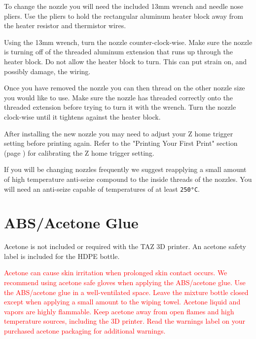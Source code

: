 To change the nozzle you will need the included 13mm wrench and needle nose pliers. Use the pliers to hold the rectangular aluminum heater block away from the heater resistor and thermistor wires.

Using the 13mm wrench, turn the nozzle counter-clock-wise. Make sure the nozzle is turning off of the threaded aluminum extension that runs up through the heater block. Do not allow the heater block to turn. This can put strain on, and possibly damage, the wiring.

Once you have removed the nozzle you can then thread on the other nozzle size you would like to use. Make sure the nozzle has threaded correctly onto the threaded extension before trying to turn it with the wrench. Turn the nozzle clock-wise until it tightens against the heater block.

After installing the new nozzle you may need to adjust your Z home trigger setting before printing again. Refer to the "Printing Your First Print" section (page \pageref{firstprint}) for calibrating the Z home trigger setting.

If you will be changing nozzles frequently we suggest reapplying a small amount of high temperature anti-seize compound to the inside threads of the nozzles. You will need an anti-seize capable of temperatures of at least \texttt{250°C}.

\section{ABS/Acetone Glue}
\label{sec:ABS/Acetone Glue}
Acetone is not included or required with the TAZ 3D printer. An acetone safety label is included for the HDPE bottle.

\textcolor{red}{Acetone can cause skin irritation when prolonged skin contact occurs. We recommend using acetone safe gloves when applying the ABS/acetone glue. Use the ABS/acetone glue in a well-ventilated space. Leave the mixture bottle closed except when applying a small amount to the wiping towel. Acetone liquid and vapors are highly flammable. Keep acetone away from open flames and high temperature sources, including the 3D printer. Read the warnings label on your purchased acetone packaging for additional warnings.}

